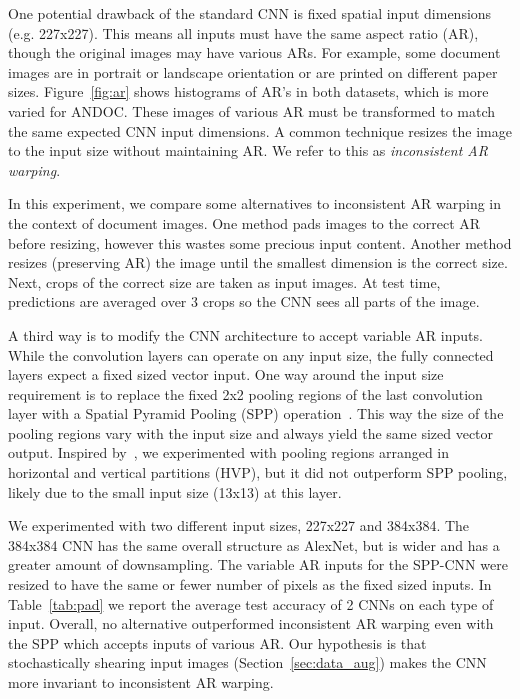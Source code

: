 \documentclass[10pt, conference, compsocconf]{IEEEtran}
\begin{document}
\label{sec:aspect_ratio}

One potential drawback of the standard CNN is fixed spatial input dimensions (e.g. 227x227).
This means all inputs must have the same aspect ratio (AR), though the original images may have various ARs.
For example, some document images are in portrait or landscape orientation or are printed on different paper sizes.
Figure~\ref{fig:ar} shows histograms of AR's in both datasets, which is more varied for ANDOC.
These images of various AR must be transformed to match the same expected CNN input dimensions.
A common technique resizes the image to the input size without maintaining AR.
We refer to this as \emph{inconsistent AR warping}.

In this experiment, we compare some alternatives to inconsistent AR warping in the context of document images.
One method pads images to the correct AR before resizing, however this wastes some precious input content.
Another method resizes (preserving AR) the image until the smallest dimension is the correct size.
Next, crops of the correct size are taken as input images.
At test time, predictions are averaged over 3 crops so the CNN sees all parts of the image.

A third way is to modify the CNN architecture to accept variable AR inputs.
While the convolution layers can operate on any input size, the fully connected layers expect a fixed sized vector input.
One way around the input size requirement is to replace the fixed 2x2 pooling regions of the last convolution layer with a Spatial Pyramid Pooling (SPP) operation~\cite{he15spatial}.
This way the size of the pooling regions vary with the input size and always yield the same sized vector output.
Inspired by~\cite{kumar13}, we experimented with pooling regions arranged in horizontal and vertical partitions (HVP), but it did not outperform SPP pooling, likely due to the small input size (13x13) at this layer.

We experimented with two different input sizes, 227x227 and 384x384.
The 384x384 CNN has the same overall structure as AlexNet, but is wider and has a greater amount of downsampling.
The variable AR inputs for the SPP-CNN were resized to have the same or fewer number of pixels as the fixed sized inputs.
In Table~\ref{tab:pad} we report the average test accuracy of 2 CNNs on each type of input.
Overall, no alternative outperformed inconsistent AR warping even with the SPP which accepts inputs of various AR.
Our hypothesis is that stochastically shearing input images (Section~\ref{sec:data_aug}) makes the CNN more invariant to inconsistent AR warping.
\end{document}
